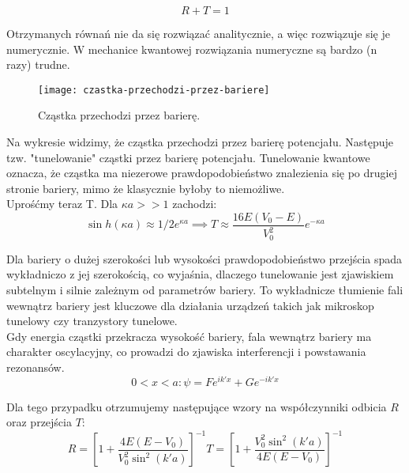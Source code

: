 \begin{equation*}
    R + T = 1
\end{equation*}


Otrzymanych równań nie da się rozwiązać analitycznie, a więc rozwiązuje się je numerycznie. W mechanice kwantowej rozwiązania
numeryczne są bardzo (n razy) trudne. \\

\begin{figure}[H]
    \centering
    \texttt{[image: czastka-przechodzi-przez-bariere]}
    \caption{Cząstka przechodzi przez barierę.}
    \label{fig:czastka-przechodzi-przez-bariere}
\end{figure}


Na wykresie widzimy, że cząstka przechodzi przez barierę potencjału. Następuje tzw. "tunelowanie" cząstki przez barierę potencjału.
Tunelowanie kwantowe oznacza, że cząstka ma niezerowe prawdopodobieństwo znalezienia się po drugiej stronie bariery,
mimo że klasycznie byłoby to niemożliwe.\\

Uprośćmy teraz T. Dla $\kappa a >> 1$ zachodzi:
\begin{equation*}
    \sin h(\kappa a) \approx 1 / 2 e^{\kappa a} \implies T \approx \frac{16 E (V_0 - E)}{V_0^2} e^{- \kappa a}
\end{equation*}


Dla bariery o dużej szerokości lub wysokości prawdopodobieństwo przejścia spada wykładniczo z jej szerokością,
co wyjaśnia, dlaczego tunelowanie jest zjawiskiem subtelnym i silnie zależnym od parametrów bariery.
To wykładnicze tłumienie fali wewnątrz bariery jest kluczowe dla działania urządzeń takich jak mikroskop tunelowy
czy tranzystory tunelowe.\\


Gdy energia cząstki przekracza wysokość bariery, fala wewnątrz bariery ma charakter oscylacyjny,
co prowadzi do zjawiska interferencji i powstawania rezonansów.
\begin{equation*}
    0 < x < a: \psi = F e^{ik'x} + G e^{-ik'x}
\end{equation*}

Dla tego przypadku otrzumujemy następujące wzory na współczynniki odbicia $R$ oraz przejścia $T$:
\begin{equation*}
    R = \left[ 1 + \frac{4 E (E - V_0)}{V_0^2 \sin^2(k'a)} \right] ^{-1}
    T = \left[ 1 + \frac{V_0^2 \sin^2(k'a)}{4 E (E - V_0)} \right] ^{-1}
\end{equation*}

